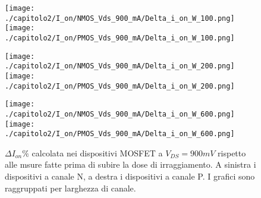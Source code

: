 \begin{figure}[t]
    \centering
    \texttt{[image: ./capitolo2/I\_on/NMOS\_Vds\_900\_mA/Delta\_i\_on\_W\_100.png]}
    \texttt{[image: ./capitolo2/I\_on/PMOS\_Vds\_900\_mA/Delta\_i\_on\_W\_100.png]}

    \vspace{0.5cm}
    \texttt{[image: ./capitolo2/I\_on/NMOS\_Vds\_900\_mA/Delta\_i\_on\_W\_200.png]}
    \texttt{[image: ./capitolo2/I\_on/PMOS\_Vds\_900\_mA/Delta\_i\_on\_W\_200.png]}

    \vspace{0.5cm}

    \texttt{[image: ./capitolo2/I\_on/NMOS\_Vds\_900\_mA/Delta\_i\_on\_W\_600.png]}
    \texttt{[image: ./capitolo2/I\_on/PMOS\_Vds\_900\_mA/Delta\_i\_on\_W\_600.png]}

    \caption[Dati $\Delta I_{on}\%$ a $V_{DS}=440mV$ ]{$\Delta I_{on}\%$ calcolata nei dispositivi MOSFET a $V_{DS} = 900mV$ rispetto alle msure fatte prima di subire la dose di irraggiamento. A sinistra i dispositivi a canale N, a destra i dispositivi a canale P. I grafici sono raggruppati per larghezza di canale.}
    \label{fig:delta_I_on_vds_900_mv}

\end{figure}


